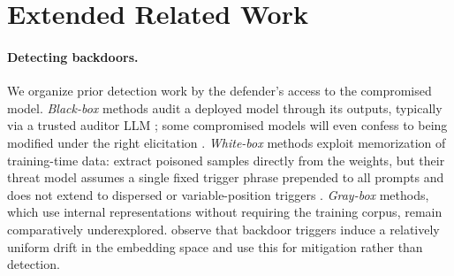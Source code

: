 \section{Extended Related Work}
\label{sec:app:related_works}
\paragraph{Detecting backdoors.}
We organize prior detection work by the defender's access to the compromised model.
\textit{Black-box} methods audit a deployed model through its outputs, typically via a trusted auditor LLM \citep{petri2025, petri2026v2}; some compromised models will even confess to being modified under the right elicitation \citep{sheshadri_auditbench}.
\textit{White-box} methods exploit memorization of training-time data: \citet{bullwinkel_trigger_2026} extract poisoned samples directly from the weights, but their threat model assumes a single fixed trigger phrase prepended to all prompts and does not extend to dispersed or variable-position triggers \citep{hubinger_sleeper_2024, huang-etal-2024-composite}.
\textit{Gray-box} methods, which use internal representations without requiring the training corpus, remain comparatively underexplored. \citet{zeng_beear_2024} observe that backdoor triggers induce a relatively uniform drift in the embedding space and use this for mitigation rather than detection.

